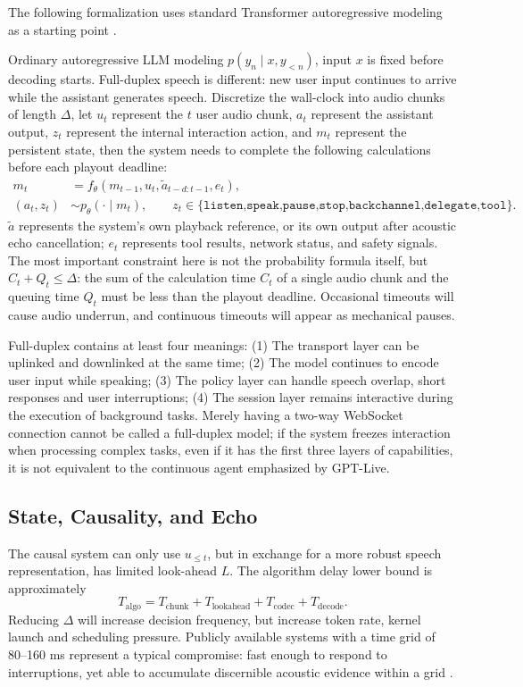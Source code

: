 \documentclass[UTF8,fontset=none,a4paper,10pt]{ctexart}
\begin{document}
The following formalization uses standard Transformer autoregressive modeling as a starting point \cite{vaswani2017attention}.

Ordinary autoregressive LLM modeling $p(y_n\mid x,y_{<n})$, input $x$ is fixed before decoding starts. Full-duplex speech is different: new user input continues to arrive while the assistant generates speech. Discretize the wall-clock into audio chunks of length $\Delta$, let $u_t$ represent the $t$ user audio chunk, $a_t$ represent the assistant output, $z_t$ represent the internal interaction action, and $m_t$ represent the persistent state, then the system needs to complete the following calculations before each playout deadline:
\begin{align}
m_t &= f_\theta(m_{t-1},u_t,\tilde a_{t-d:t-1},e_t),\\
(a_t,z_t) &\sim p_\theta(\cdot\mid m_t),\qquad
z_t\in\{\texttt{listen,speak,pause,stop,backchannel,delegate,tool}\}.
\end{align}
$\tilde a$ represents the system's own playback reference, or its own output after acoustic echo cancellation; $e_t$ represents tool results, network status, and safety signals. The most important constraint here is not the probability formula itself, but $C_t+Q_t\leq\Delta$: the sum of the calculation time $C_t$ of a single audio chunk and the queuing time $Q_t$ must be less than the playout deadline. Occasional timeouts will cause audio underrun, and continuous timeouts will appear as mechanical pauses.

Full-duplex contains at least four meanings: (1) The transport layer can be uplinked and downlinked at the same time; (2) The model continues to encode user input while speaking; (3) The policy layer can handle speech overlap, short responses and user interruptions; (4) The session layer remains interactive during the execution of background tasks. Merely having a two-way WebSocket connection cannot be called a full-duplex model; if the system freezes interaction when processing complex tasks, even if it has the first three layers of capabilities, it is not equivalent to the continuous agent emphasized by GPT-Live.

\subsection{State, Causality, and Echo}

The causal system can only use $u_{\le t}$, but in exchange for a more robust speech representation, has limited look-ahead $L$. The algorithm delay lower bound is approximately
\begin{equation}
T_{\mathrm{algo}}=T_{\mathrm{chunk}}+T_{\mathrm{lookahead}}+T_{\mathrm{codec}}+T_{\mathrm{decode}}.
\end{equation}
Reducing $\Delta$ will increase decision frequency, but increase token rate, kernel launch and scheduling pressure. Publicly available systems with a time grid of 80--160 ms represent a typical compromise: fast enough to respond to interruptions, yet able to accumulate discernible acoustic evidence within a grid \cite{defossez2024moshi,zhang2026duplexsla}.
\end{document}
